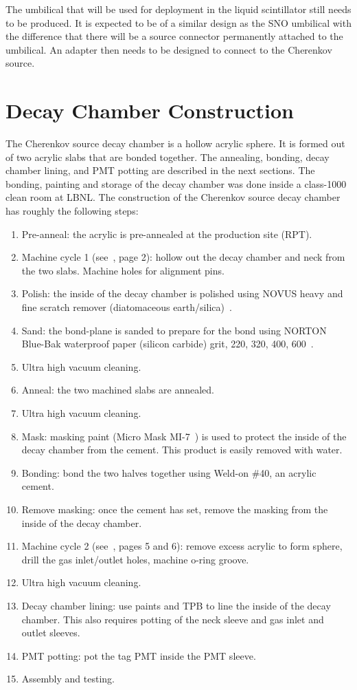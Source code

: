 The umbilical that will be used for deployment in the liquid scintillator still needs to be produced. 
It is expected to be of a similar design as the SNO \Li umbilical with the difference that there will be a source connector permanently attached to the umbilical. 
An adapter then needs to be designed to connect to the Cherenkov source. 

\section{Decay Chamber Construction}
\label{chap:construction}

The Cherenkov source decay chamber is a hollow acrylic sphere.
It is formed out of two acrylic slabs that are bonded together.
The annealing, bonding, decay chamber lining, and PMT potting are described in the next sections.
The bonding, painting and storage of the decay chamber was done inside a class-1000 clean room at LBNL.
The construction of the Cherenkov source decay chamber has roughly the following steps:

\begin{enumerate}
\item Pre-anneal: the acrylic is pre-annealed at the production site (RPT).
\item Machine cycle 1 (see~\cite{wallig:2015}, page 2): hollow out the decay chamber and neck from the two slabs. Machine holes for alignment pins. 
\item Polish: the inside of the decay chamber is polished using NOVUS heavy and fine scratch remover (diatomaceous earth/silica)~\cite{polish}. 
\item Sand: the bond-plane is sanded to prepare for the bond using NORTON Blue-Bak waterproof paper (silicon carbide) grit, 220, 320, 400, 600~\cite{sand}.
\item Ultra high vacuum cleaning.
\item Anneal: the two machined slabs are annealed.
\item Ultra high vacuum cleaning.
\item Mask: masking paint (Micro Mask MI-7~\cite{masking}) is used to protect the inside of the decay chamber from the cement. This product is easily removed with water.
\item Bonding: bond the two halves together using Weld-on \#40, an acrylic cement. 
\item Remove masking: once the cement has set, remove the masking from the inside of the decay chamber.
\item Machine cycle 2 (see~\cite{wallig:2015}, pages 5 and 6): remove excess acrylic to form sphere, drill the gas inlet/outlet holes, machine o-ring groove.
\item Ultra high vacuum cleaning.
\item Decay chamber lining: use paints and TPB to line the inside of the decay chamber. This also requires potting of the neck sleeve and gas inlet and outlet sleeves.
\item PMT potting: pot the tag PMT inside the PMT sleeve.
\item Assembly and testing.
\end{enumerate}

